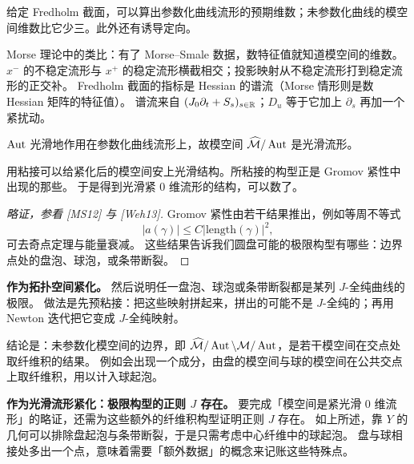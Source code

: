 
\begin{claim}\label{c7:claim-expected-dim}
给定 Fredholm 截面，可以算出参数化曲线流形的预期维数；未参数化曲线的模空间维数比它少三。此外还有诱导定向。
\end{claim}

Morse 理论中的类比：有了 Morse--Smale 数据，数特征值就知道模空间的维数。
$x^-$ 的不稳定流形与 $x^+$ 的稳定流形横截相交；投影映射从不稳定流形打到稳定流形的正交补。
Fredholm 截面的指标是 Hessian 的谱流（Morse 情形则是数 Hessian 矩阵的特征值）。
谱流来自 $(J_0\partial_t+S_s)_{s\in\mathbb{R}}$；$D_u$ 等于它加上 $\partial_s$ 再加一个紧扰动。

\begin{claim}\label{c7:claim-aut-action}
$\operatorname{Aut}$ 光滑地作用在参数化曲线流形上，故模空间 $\widehat{\mathcal{M}}/\operatorname{Aut}$ 是光滑流形。
\end{claim}

\begin{claim}\label{c7:claim-gluing}
用粘接可以给紧化后的模空间安上光滑结构。所粘接的构型正是 Gromov 紧性中出现的那些。
于是得到光滑紧 $0$ 维流形的结构，可以数了。
\end{claim}

\begin{proof}[{略证，参看 [MS12] 与 [Weh13]}]
Gromov 紧性由若干结果推出，例如等周不等式
\[
|a(\gamma)|\le C|\mathrm{length}(\gamma)|^2,
\]
可去奇点定理与能量衰减。
这些结果告诉我们圆盘可能的极限构型有哪些：边界点处的盘泡、球泡，或条带断裂。
\end{proof}

\textbf{作为拓扑空间紧化。}
然后说明任一盘泡、球泡或条带断裂都是某列 $J$-全纯曲线的极限。
做法是先预粘接：把这些映射拼起来，拼出的可能不是 $J$-全纯的；再用 Newton 迭代把它变成 $J$-全纯映射。

结论是：未参数化模空间的边界，即 $\widehat{\mathcal{M}}/\operatorname{Aut}\setminus\mathcal{M}/\operatorname{Aut}$，是若干模空间在交点处取纤维积的结果。
例如会出现一个成分，由盘的模空间与球的模空间在公共交点上取纤维积，用以计入球起泡。

\textbf{作为光滑流形紧化：极限构型的正则 $J$ 存在。}
要完成「模空间是紧光滑 $0$ 维流形」的略证，还需为这些额外的纤维积构型证明正则 $J$ 存在。
如上所述，靠 $Y$ 的几何可以排除盘起泡与条带断裂，于是只需考虑中心纤维中的球起泡。
盘与球相接处多出一个点，意味着需要「额外数据」的概念来记账这些特殊点。

